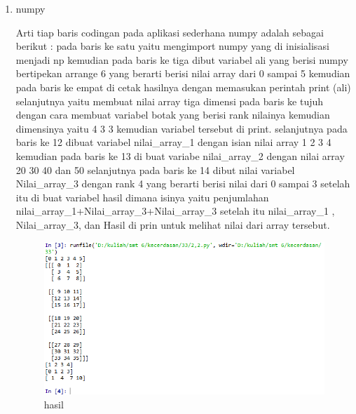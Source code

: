 \begin{enumerate}
\item numpy\par
Arti tiap baris codingan pada aplikasi sederhana numpy adalah sebagai berikut : pada baris ke satu yaitu mengimport numpy yang di inisialisasi menjadi np kemudian pada baris ke tiga dibut variabel ali yang berisi numpy bertipekan arrange 6 yang berarti berisi nilai array dari 0 sampai 5 kemudian pada baris ke empat di cetak hasilnya dengan memasukan perintah print (ali) selanjutnya yaitu membuat nilai array tiga dimensi pada baris ke tujuh dengan cara membuat variabel botak yang berisi rank nilainya kemudian dimensinya yaitu 4 3 3 kemudian variabel tersebut di print. selanjutnya pada baris ke 12 dibuat variabel nilai\_array\_1 dengan isian nilai array 1 2 3 4 kemudian pada baris ke 13 di buat variabe nilai\_array\_2 dengan nilai array 20 30 40 dan 50 selanjutnya pada baris ke 14 dibut nilai variabel Nilai\_array\_3 dengan rank 4 yang berarti berisi nilai dari 0 sampai 3 setelah itu di buat variabel hasil dimana isinya yaitu penjumlahan nilai\_array\_1+Nilai\_array\_3+Nilai\_array\_3 setelah itu nilai\_array\_1 , Nilai\_array\_3, dan Hasil di prin untuk melihat nilai dari array tersebut.

\begin{figure}[ht]
\centering
\includegraphics[scale=0.5]{figures/1174051/3/5.PNG}
\caption{hasil}
\label{contoh}
\end{figure}


\end{enumerate}
